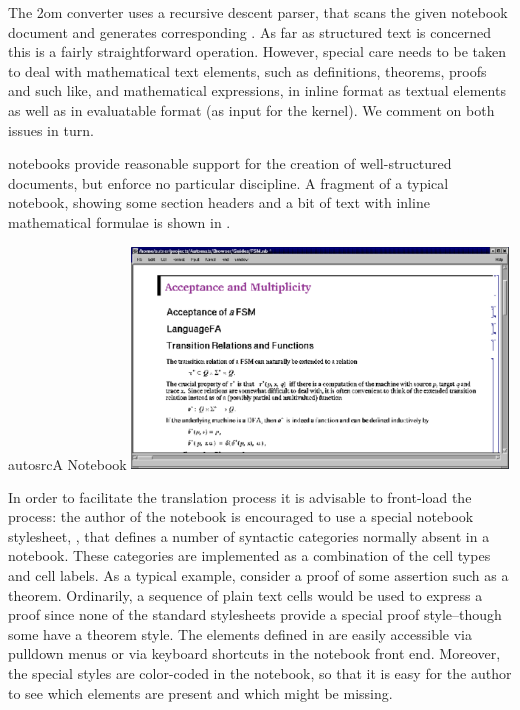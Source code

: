 The {\nb2om} converter uses a recursive descent parser, that scans the given notebook
document and generates corresponding {\omdoc}.  As far as structured text is concerned
this is a fairly straightforward operation.  However, special care needs to be taken to
deal with mathematical text elements, such as definitions, theorems, proofs and such like,
and mathematical expressions, in inline format as textual elements as well as in
evaluatable format (as input for the {\mathematica} kernel).  We comment on both issues in
turn.

{\mathematica} notebooks provide reasonable support for the creation of
well-structured documents, but enforce no particular discipline.  A fragment of a
typical notebook, showing some section headers and a bit of text with inline
mathematical formulae is shown in {}.

\begin{myfig}{autosrc}{A {\mathematica} Notebook}
\includegraphics[width=10cm]{projects/mathematica/autosrc}
\end{myfig}

In order to facilitate the translation process it is advisable to front-load the
process: the author of the notebook is encouraged to use a special notebook
stylesheet, {}, that defines a number of syntactic categories
normally absent in a notebook.  These categories are implemented as a combination
of the cell types and cell labels.  As a typical example, consider a proof of some
assertion such as a theorem.  Ordinarily, a sequence of plain text cells would be
used to express a proof since none of the standard {\mathematica} stylesheets
provide a special proof style--though some have a theorem style.  The elements
defined in {} are easily accessible via pulldown menus or via
keyboard shortcuts in the notebook front end.  Moreover, the special styles are
color-coded in the notebook, so that it is easy for the author to see which
elements are present and which might be missing.


